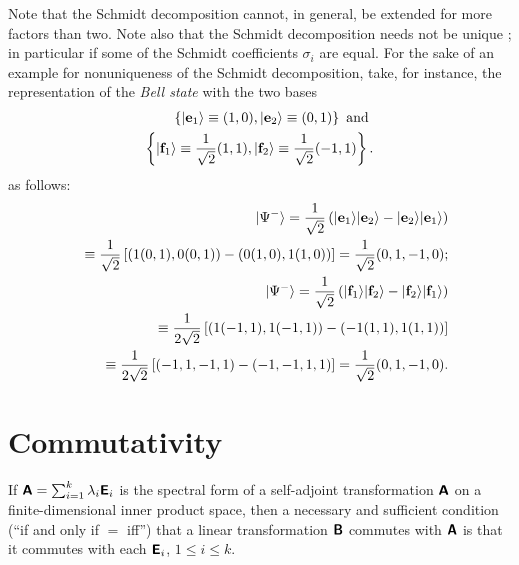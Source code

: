 Note that the Schmidt decomposition cannot, in general, be extended for more factors than two.
Note also that the Schmidt decomposition needs not be unique \cite{ekert:415};
in particular if some of the Schmidt coefficients $\sigma_i$ are equal.
For the sake of an example for nonuniqueness of the Schmidt decomposition,
take, for instance, the representation of the {\em Bell state} 
with the two bases
\begin{equation}
\begin{split}
\left\{
\vert {\bf e}_1\rangle \equiv (1,0),
\vert {\bf e}_2\rangle \equiv (0,1)
\right\}
\textrm{ and }\\
\left\{
\vert {\bf f}_1\rangle \equiv \frac{1}{\sqrt{2}}(1,1),
\vert {\bf f}_2\rangle \equiv \frac{1}{\sqrt{2}}(-1,1)
\right\}.
\end{split}
\end{equation}
as follows:
\begin{equation}
\begin{split}
\vert {\Psi^-} \rangle =
\frac{1}{\sqrt{2}}
\left(
\vert {\bf e}_1\rangle
\vert {\bf e}_2\rangle
-
\vert {\bf e}_2\rangle
\vert {\bf e}_1\rangle
\right)\\
\quad \equiv
\frac{1}{\sqrt{2}}
\left[
(1 (0,1),0(0,1))- (0 (1,0),1(1,0))\right] = \frac{1}{\sqrt{2}} (0,1,-1,0); \\
\vert {\Psi^-} \rangle =
\frac{1}{\sqrt{2}}
\left(
\vert {\bf f}_1\rangle
\vert {\bf f}_2\rangle
-
\vert {\bf f}_2\rangle
\vert {\bf f}_1\rangle
\right) \\
\quad \equiv
\frac{1}{2\sqrt{2}}
\left[
(1 (-1,1),1(-1,1))- ( -1 (1,1),1(1,1))\right]  \\
\quad \equiv
\frac{1}{2\sqrt{2}}
\left[
( -1  , 1 ,-1 ,1 ) - ( -1,-1 ,1 ,1 )\right]
 = \frac{1}{\sqrt{2}} (0,1,-1,0)
.
\end{split}
\end{equation}





\section{Commutativity}

If $\textsf{\textbf{A}}=\sum_{i=1}^k \lambda_i\textsf{\textbf{E}}_i$
is the spectral form of a self-adjoint transformation  $\textsf{\textbf{A}}$
on a finite-dimensional inner product space,
then a necessary and sufficient condition (``if and only if $=$ iff'')
that a linear transformation
 $\textsf{\textbf{B}}$ commutes with
 $\textsf{\textbf{A}}$
is that it commutes with each
$\textsf{\textbf{E}}_i$, $1\le i\le k$.

